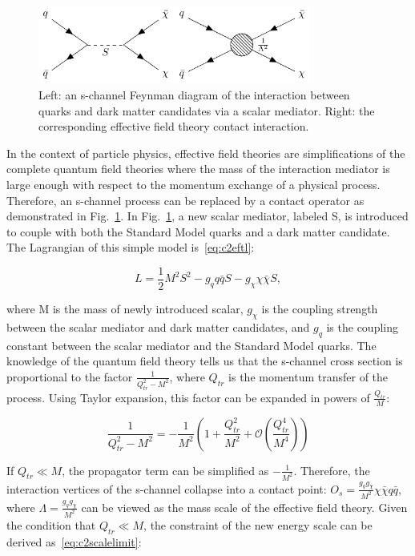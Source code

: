 \begin{figure}[htbp]
    \centering
    \includegraphics[width=0.8\textwidth]{chapters/c2/figures/eft-feyn-diagram}
    \caption{Left: an s-channel Feynman diagram of the interaction between quarks and dark matter candidates via a scalar mediator. Right: the corresponding effective field theory contact interaction.}
    \label{fig:c2eftfeyndiagram}
\end{figure}

In the context of particle physics, effective field theories are simplifications of the complete quantum field theories where the mass of the interaction mediator is large enough with respect to the momentum exchange of a physical process. Therefore, an s-channel process can be replaced by a contact operator as demonstrated in Fig.~\ref{fig:c2eftfeyndiagram}. In Fig.~\ref{fig:c2eftfeyndiagram}, a new scalar mediator, labeled S, is introduced to couple with both the Standard Model quarks and a dark matter candidate. The Lagrangian of this simple model is~\ref{eq:c2eftl}:

\begin{equation}
  L = \frac{1}{2}M^{2}S^{2}-g_{q}q\bar{q}S-g_{\chi}\chi\bar{\chi}S,
  \label{eq:c2eftl}
\end{equation}

where M is the mass of newly introduced scalar, $g_{\chi}$ is the coupling strength between the scalar mediator and dark matter candidates, and $g_{q}$ is the coupling constant between the scalar mediator and the Standard Model quarks. The knowledge of the quantum field theory tells us that the s-channel cross section is proportional to the factor $\frac{1}{Q_{tr}^{2}-M^{2}}$, where $Q_{tr}$ is the momentum transfer of the process. Using Taylor expansion, this factor can be expanded in powers of $\frac{Q_{tr}}{M}$: 

\begin{equation}
  \frac{1}{Q^{2}_{tr}-M^{2}} = -\frac{1}{M^{2}}(1+\frac{Q^{2}_{tr}}{M^{2}}+\mathcal{O}(\frac{Q^{4}_{tr}}{M^{4}}))
  \label{eq:c2taylorexp}
\end{equation}

If $Q_{tr} \ll M$, the propagator term can be simplified as $-\frac{1}{M^2}$. Therefore, the interaction vertices of the s-channel collapse into a contact point: $O_{s}=\frac{g_{q}g_{\chi}}{M^{2}}\chi\bar{\chi}q\bar{q}$, where $\Lambda=\frac{g_{q}g_{\chi}}{M^{2}}$ can be viewed as the mass scale of the effective field theory. Given the condition that $Q_{tr} \ll M$, the constraint of the new energy scale can be derived as~\ref{eq:c2scalelimit}:

